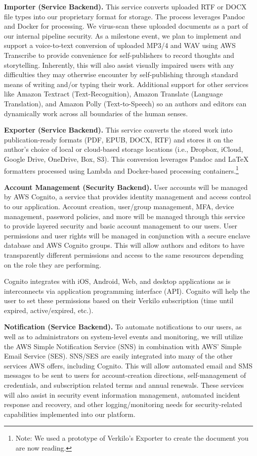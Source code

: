 \documentclass[11pt,openany]{book}
\begin{document}
\textbf{Importer (Service Backend).} This service converts uploaded RTF
or DOCX file types into our proprietary format for storage. The process
leverages Pandoc and Docker for processing. We virus-scan these uploaded
documents as a part of our internal pipeline security. As a milestone
event, we plan to implement and support a voice-to-text conversion of
uploaded MP3/4 and WAV using AWS Transcribe to provide convenience for
self-publishers to record thoughts and storytelling. Inherently, this
will also assist visually impaired users with any difficulties they may
otherwise encounter by self-publishing through standard means of writing
and/or typing their work. Additional support for other services like
Amazon Textract (Text-Recognition), Amazon Translate (Language
Translation), and Amazon Polly (Text-to-Speech) so an authors and
editors can dynamically work across all boundaries of the human senses.

\textbf{Exporter (Service Backend).} This service converts the stored
work into publication-ready formats (PDF, EPUB, DOCX, RTF) and stores it
on the author's choice of local or cloud-based storage locations (i.e.,
Dropbox, iCloud, Google Drive, OneDrive, Box, S3). This conversion
leverages Pandoc and LaTeX formatters processed using Lambda and
Docker-based processing containers.\footnote{Note: We used a prototype
  of Verkilo's Exporter to create the document you are now reading.}

\textbf{Account Management (Security Backend).} User accounts will be
managed by AWS Cognito, a service that provides identity management and
access control to our application. Account creation, user/group
management, MFA, device management, password policies, and more will be
managed through this service to provide layered security and basic
account management to our users. User permissions and user rights will
be managed in conjunction with a secure enclave database and AWS Cognito
groups. This will allow authors and editors to have transparently
different permissions and access to the same resources depending on the
role they are performing.

Cognito integrates with iOS, Android, Web, and desktop applications as
is interconnects via application programming interface (API). Cognito
will help the user to set these permissions based on their Verkilo
subscription (time until expired, active/expired, etc.).

\textbf{Notification (Service Backend).} To automate notifications to
our users, as well as to administrators on system-level events and
monitoring, we will utilize the AWS Simple Notification Service (SNS) in
combination with AWS' Simple Email Service (SES). SNS/SES are easily
integrated into many of the other services AWS offers, including
Cognito. This will allow automated email and SMS messages to be sent to
users for account-creation directions, self-management of credentials,
and subscription related terms and annual renewals. These services will
also assist in security event information management, automated incident
response and recovery, and other logging/monitoring needs for
security-related capabilities implemented into our platform.
\end{document}
